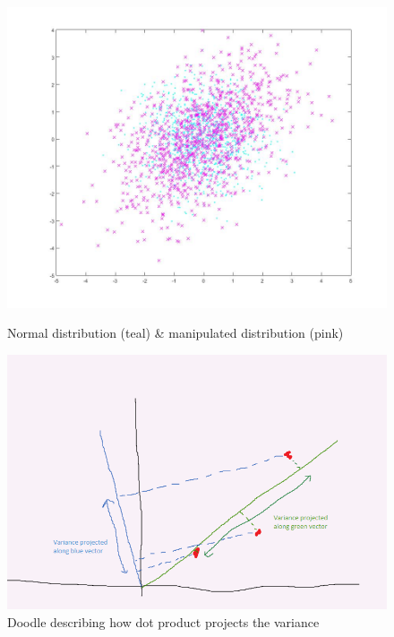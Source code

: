 \documentclass[10pt]{article}
\begin{document}
\begin{figure}[!h]
  \centering
  \begin{minipage}[b]{0.3\textwidth}
      \includegraphics[width=\textwidth]{twoDGaussian.jpg}
      \caption{Normal distribution (teal) \& manipulated distribution (pink)}
  \end{minipage}
  \hfill
  \begin{minipage}[b]{0.3\textwidth}
     \includegraphics[width=\textwidth]{varianceProjection.png}
     \caption{Doodle describing how dot product projects the variance}
  \end{minipage}
  \begin{minipage}[b]{0.3\textwidth}

\end{minipage}
\end{figure}
\end{document}
